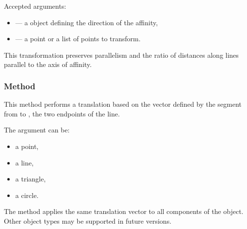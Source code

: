 \medskip

Accepted arguments:
\begin{itemize}
  \item {} — a  object defining the direction of the affinity,
  \item {} — a point or a list of points to transform.
\end{itemize}


This transformation preserves parallelism and the ratio of distances along lines parallel to the axis of affinity.

\vspace{1em}

\begin{tkzexample}[latex=.5\textwidth]
\begin{center}
\end{center}

\end{tkzexample}

\subsubsection{Method }
\label{ssub:example_translation}

This method performs a translation based on the vector defined by the segment from  to , the two endpoints of the line.

\medskip

The argument  can be:
\begin{itemize}
  \item a point,
  \item a line,
  \item a triangle,
  \item a circle.
\end{itemize}


The method applies the same translation vector to all components of the object. Other object types may be supported in future versions.

